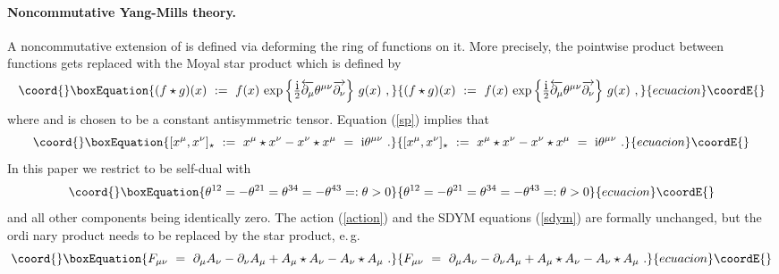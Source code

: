 \documentclass[a4paper,11pt,english]{article}
\numberwithin{equation}{section}
\providecommand{\sfrac}[2]{{\textstyle\frac{#1}{#2}}}
\providecommand{\ii}{\mbox{i}}
\renewcommand{\=}{\ =\ }
\begin{document}
\paragraph{Noncommutative Yang-Mills theory.} 
A noncommutative extension of \coordHE{} is defined via deforming the
ring of functions on it. More precisely, the pointwise product between 
functions gets replaced with the Moyal star product which is defined by
\begin{equation}\coord{}\boxEquation{\label{sp}
 (f\star g)(x)\ :=\ f(x)\,\exp\left\{\sfrac{\ii}{2}\overleftarrow{\partial_{\mu
}}\theta^{\mu\nu}\overrightarrow{\partial_{\nu}}\right\}\,g(x)\ ,
}{(f\star g)(x)\ :=\ f(x)\,\exp\left\{\sfrac{\ii}{2}\overleftarrow{\partial_{\mu
}}\theta^{\mu\nu}\overrightarrow{\partial_{\nu}}\right\}\,g(x)\ ,
}{ecuacion}\coordE{}\end{equation}
where \coordHE{} and \myHighlight{$\theta^{\mu\nu}$}\coordHE{} is 
chosen to be a constant antisymmetric tensor. Equation (\ref{sp}) implies that
\begin{equation}\coord{}\boxEquation{
 [x^{\mu},x^{\nu}]_{\star}\ :=\ x^{\mu}\star x^{\nu}-x^{\nu}\star x^{\mu}\=
\ii\theta^{\mu\nu}\ .
}{
 [x^{\mu},x^{\nu}]_{\star}\ :=\ x^{\mu}\star x^{\nu}-x^{\nu}\star x^{\mu}\=
\ii\theta^{\mu\nu}\ .
}{ecuacion}\coordE{}\end{equation}%
In this paper we restrict \myHighlight{$\theta^{\mu\nu}$}\coordHE{} to be self-dual with
\begin{equation}\coord{}\boxEquation{\label{cot}
 \theta^{12}=-\theta^{21}=\theta^{34}=-\theta^{43}=:\theta>0
}{\theta^{12}=-\theta^{21}=\theta^{34}=-\theta^{43}=:\theta>0
}{ecuacion}\coordE{}\end{equation}
and all other components being identically zero. The action (\ref{action}) and
the SDYM equations (\ref{sdym}) are formally unchanged, but the ordi%
nary product needs to be replaced by the star product, e.\,g.
\begin{equation}\coord{}\boxEquation{
 {F}_{\mu\nu}\=\partial_{\mu}{A}_{\nu}-\partial_{\nu}
{A}_{\mu}+{A}_{\mu}\star{A}_{\nu}-{A}_{\nu}\star{A}_{\mu}\ .
}{
 {F}_{\mu\nu}\=\partial_{\mu}{A}_{\nu}-\partial_{\nu}
{A}_{\mu}+{A}_{\mu}\star{A}_{\nu}-{A}_{\nu}\star{A}_{\mu}\ .
}{ecuacion}\coordE{}\end{equation}
\end{document}
